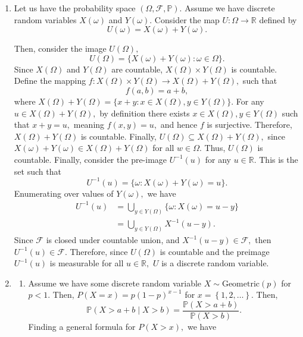 \documentclass[12pt]{article}
\begin{document}
\begin{enumerate}
  \item Let us have the probability space $(\Omega, \mathcal F,
    \mathbb P).$ Assume we have discrete random variables $X(\omega)$
    and $Y(\omega).$ Consider the map $U : \Omega \to \mathbb R$ defined by
    $$
    U(\omega) = X(\omega) + Y(\omega).
    $$

    Then, consider the image $U(\Omega),$
    $$
    U(\Omega) = \{X(\omega) + Y(\omega) : \omega \in \Omega\}.
    $$
    Since $X(\Omega)$ and $Y(\Omega)$ are countable, $X(\Omega)
    \times Y(\Omega)$ is countable. Define the mapping $f: X(\Omega)
    \times Y(\Omega) \to X(\Omega) + Y(\Omega),$ such that
    $$
    f(a, b) = a + b,
    $$
    where $X(\Omega) + Y(\Omega) = \{x + y: x\in X(\Omega), y \in
    Y(\Omega)\}.$ For any $u \in X(\Omega) + Y(\Omega),$ by
    definition there exists $x \in X(\Omega), y \in Y(\Omega)$ such
    that $x + y = u,$ meaning $f(x, y) = u,$ and hence $f$ is
    surjective. Therefore, $X(\Omega) + Y(\Omega)$ is countable.
    Finally, $U(\Omega) \subseteq X(\Omega) + Y(\Omega),$ since
    $X(\omega) + Y(\omega) \in X(\Omega) + Y(\Omega)$ for all $w \in
    \Omega.$ Thus, $U(\Omega)$ is countable.
    Finally, consider the pre-image $U^{-1}(u)$ for any $u \in
    \mathbb R.$ This is the set such that
    $$
    U^{-1}(u) = \{\omega : X(\omega) + Y(\omega) = u \}.
    $$
    Enumerating over values of $Y(\omega),$ we have
    \begin{align*}
      U^{-1}(u) &= \bigcup_{y \in Y(\Omega)} \{\omega : X(\omega) = u - y\} \\
      &= \bigcup_{y \in Y(\Omega)} X^{-1}(u - y).
    \end{align*}
    Since $\mathcal F$ is closed under countable union, and $X^{-1}(u
    - y) \in \mathcal F,$ then $U^{-1}(u) \in \mathcal F.$
    Therefore, since $U(\Omega)$ is countable and the preimage
    $U^{-1}(u)$ is measurable for all $u \in \mathbb R,$ $U$ is a
    discrete random variable.
  \item
    \begin{enumerate}
      \item Assume we have some discrete random variable $X \sim
        \text{Geometric}(p)$ for $p < 1.$ Then, $P(X = x) =
        p(1-p)^{x-1}$ for $x = \left\{1, 2, \ldots \right\}.$ Then,
        $$
        \mathbb P(X > a + b \mid X > b) = \dfrac{\mathbb P(X > a +
        b)}{\mathbb P(X > b)}.
        $$
        Finding a general formula for $P(X > x),$ we have
        \begin{align*}

\end{align*}
\end{enumerate}
\end{enumerate}
\end{document}
